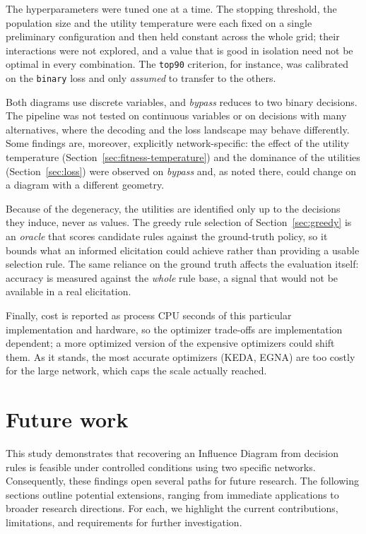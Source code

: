The hyperparameters were tuned one at a time. The stopping threshold, the
population size and the utility temperature were each fixed on a single
preliminary configuration and then held constant across the whole grid; their
interactions were not explored, and a value that is good in isolation need not be
optimal in every combination. The \texttt{top90} criterion, for instance, was
calibrated on the \texttt{binary} loss and only \emph{assumed} to transfer to
the others.

Both diagrams use discrete variables, and \emph{bypass} reduces to two binary
decisions. The pipeline was not tested on continuous variables or on decisions
with many alternatives, where the decoding and the loss landscape may behave
differently. Some findings are, moreover, explicitly network-specific: the
effect of the utility temperature (Section~\ref{sec:fitness-temperature}) and the
dominance of the utilities (Section~\ref{sec:loss}) were observed on
\emph{bypass} and, as noted there, could change on a diagram with a different
geometry.

Because of the degeneracy, the utilities are identified only up to the decisions
they induce, never as values. The greedy rule selection of
Section~\ref{sec:greedy} is an \emph{oracle} that scores candidate rules against
the ground-truth policy, so it bounds what an informed elicitation could achieve
rather than providing a usable selection rule. The same reliance on the ground
truth affects the evaluation itself: accuracy is measured against the
\emph{whole} rule base, a signal that would not be available in a real
elicitation.

Finally, cost is reported as process CPU seconds of this particular
implementation and hardware, so the optimizer trade-offs are implementation
dependent; a more optimized version of the expensive optimizers could shift
them. As it stands, the most accurate optimizers (KEDA, EGNA) are too costly for
the large network, which caps the scale actually reached.
\section{Future work}
\label{sec:future}

This study demonstrates that recovering an Influence Diagram from decision rules is feasible under controlled conditions using two specific networks. Consequently, these findings open several paths for future research. The following sections outline potential extensions, ranging from immediate applications to broader research directions. For each, we highlight the current contributions, limitations, and requirements for further investigation.

